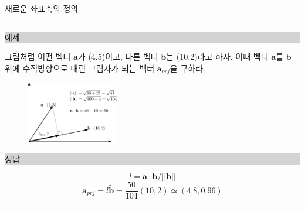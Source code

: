 \documentclass{beamer}
\begin{document}
\begin{frame}{새로운 좌표축의 정의}

\hrule
\noindent \colorbox{lightgray}{\begin{minipage}{6cm}예제\end{minipage}} 


\noindent 그림처럼 어떤 벡터 $\mathbf a$가 (4,5)이고, 다른 벡터 $\mathbf b$는 (10,2)라고 하자.
이때 벡터 $\mathbf a$를 $\mathbf b$ 위에 수직방향으로 내린 그림자가 되는 벡터 $\mathbf a_{prj}$을 구하라.

\begin{figure}
    \includegraphics[width=4cm]{Math_vector/vecProjection.eps}
\end{figure}

\noindent \colorbox{lightgray}{\begin{minipage}{6cm}정답\end{minipage}} 

$$l = \mathbf a \cdot \mathbf b / || \mathbf b||$$
$$\mathbf a_{prj} = l \tilde{\mathbf b} = \frac{50}{104} (10,2)  \simeq  (4.8, 0.96) $$

\hrule

\end{frame}
\end{document}
